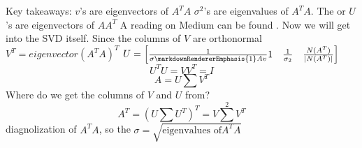 Key takeaways:\markdownRendererInterblockSeparator
{}\markdownRendererUlBegin
\markdownRendererUlItem $v$'s are eigenvectors of $A^TA$\markdownRendererUlItemEnd 
\markdownRendererUlItem $\sigma^2$'s are eigenvalues of $A^TA$.\markdownRendererUlItemEnd 
\markdownRendererUlItem The or\markdownRendererUlItemEnd 
\markdownRendererUlItem $U$'s are eigenvectors of $AA^T$\markdownRendererUlItemEnd 
\markdownRendererUlEnd \markdownRendererInterblockSeparator
{}A reading on Medium can be found . Now we will get into the SVD itself. Since the columns of $V$ are orthonormal\markdownRendererEllipsis{}\markdownRendererInterblockSeparator
{}\markdownRendererUlBegin
\markdownRendererUlItem $V^T = eigenvector(A^TA)^T$\markdownRendererUlItemEnd 
\markdownRendererUlItem $U = \begin{bmatrix}\frac{1}{\sigma\markdownRendererEmphasis{1}Av}1 & \frac{1}{\sigma_2} & \frac{N(A^T)}{|N(A^T)|}\end{bmatrix}$\markdownRendererUlItemEnd 
\markdownRendererUlEnd \markdownRendererInterblockSeparator
{}$$U^TU=VV^T=I$$\markdownRendererInterblockSeparator
{}$$A = U\sum V^T$$\markdownRendererInterblockSeparator
{}Where do we get the columns of $V$ and $U$ from?\markdownRendererInterblockSeparator
{}$$A^T = (U\sum U^T)^T=V\sum^2 V^T$$\markdownRendererInterblockSeparator
{}diagnolization of $A^TA$, so the $\sigma=\sqrt{\text{eigenvalues of}A^TA}$\relax